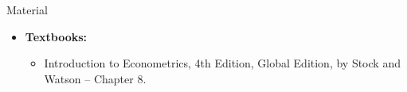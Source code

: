 \documentclass[notes,10pt, aspectratio=169]{beamer}
\begin{document}
\begin{frame}[allowframebreaks]{Material}
\begin{itemize}
    \item[--] \textbf{Textbooks:}
    \begin{itemize}
        \item Introduction to Econometrics, 4th Edition, Global Edition, by Stock and Watson -- Chapter 8.
    \end{itemize}
\end{itemize}
\end{frame}
\end{document}
